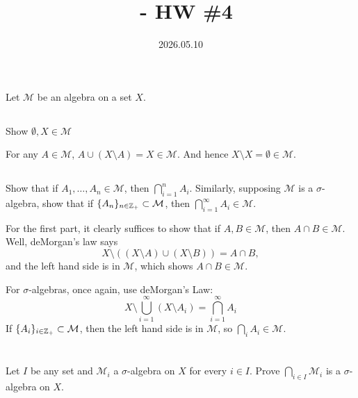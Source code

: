 \documentclass[12pt]{article}
\title{\course\ - HW \#4}
\author{\myname}
\date{2026.05.10}
\begin{document}
\maketitle
\thispagestyle{fancy}

\newcommand{\M}{\mathcal{M}}
\newcommand{\scrC}{\mathscr{C}}
\newcommand{\sigalg}[1]{\sigma\text{-alg}(#1)}

\section{}
Let $\M$ be an algebra on a set $X$. 
\subsection{} 
Show $\emptyset, X \in \M$ 

\noindent \dotfill

For any $A \in \M$, $A \cup (X \setminus A) = X \in \M$. 
And hence $X \setminus X = \emptyset \in \M$. 

\subsection{} 
Show that if $A_1, \ldots, A_n \in \M$, then $\bigcap_{i = 1}^{n} A_i$. 
Similarly, supposing $\M$ is a $\sigma$-algebra, show that if $\{A_n\}_{n \in \Zpl} \subset \M$, then $\bigcap_{i = 1}^{\infty} A_i \in \M$.

\noindent\dotfill

For the first part, it clearly suffices to show that if $A, B \in \M$, then $A \cap B \in \M$. 
Well, deMorgan's law says  
$$X \setminus ((X \setminus A) \cup (X \setminus B)) = A \cap B,$$
and the left hand side is in $\M$, which shows $A \cap B \in \M$.  

For $\sigma$-algebras, once again, use deMorgan's Law: 
$$X \setminus \bigcup_{i = 1}^{\infty} (X \setminus A_i) = \bigcap_{i = 1}^{\infty} A_i$$
If $\{A_i\}_{i \in \Zpl} \subset \M$, then the left hand side is in $\M$, so $\bigcap_{i} A_i \in \M$. 

\section{} 
\subsection{} 
Let $I$ be any set and $\M_i$ a $\sigma$-algebra on $X$ for every $i \in I$. 
Prove $\bigcap_{i \in I} \M_i$ is a $\sigma$-algebra on $X$. 
\end{document}
